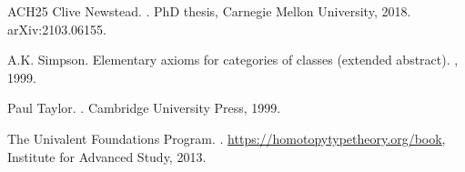 \documentclass[12pt,reqno]{amsart}
\theoremstyle{remark}
\theoremstyle{definition}
\begin{document}
\begin{thebibliography}{ACH{\etalchar{+}}25}
Clive Newstead.
.
\newblock Ph{D} thesis, Carnegie Mellon University, 2018.
\newblock arXiv:2103.06155.

A.K. Simpson.
\newblock Elementary axioms for categories of classes (extended abstract).
,
  1999.

Paul Taylor.
.
\newblock Cambridge University Press, 1999.

The {Univalent Foundations Program}.
.
\newblock \url{https://homotopytypetheory.org/book}, Institute for Advanced
  Study, 2013.

\end{thebibliography}


\end{document}
